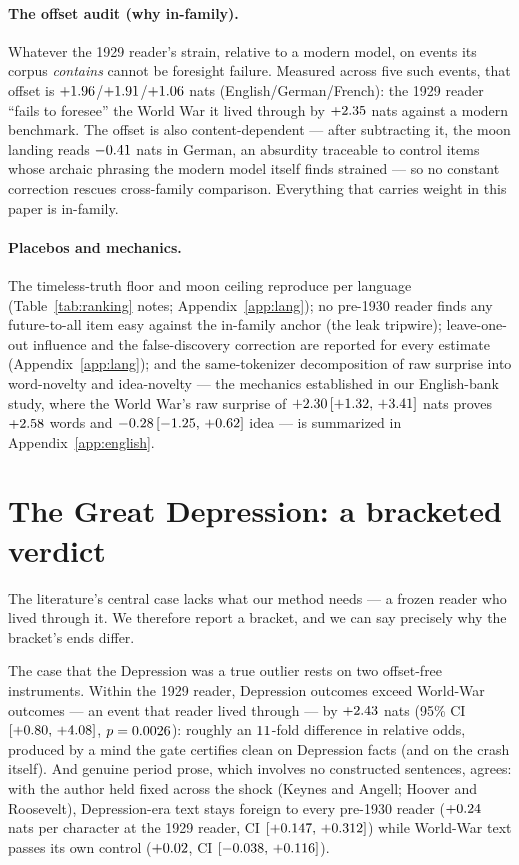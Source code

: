 \documentclass[11pt]{article}
\begin{document}
\paragraph{The offset audit (why in-family).} Whatever the 1929 reader's strain, relative to a modern model,
on events its corpus \emph{contains} cannot be foresight failure. Measured across five such events, that
offset is $+1.96$/$+1.91$/$+1.06$ nats (English/German/French): the 1929 reader
``fails to foresee'' the World War it lived through by $+2.35$ nats against a modern benchmark. The
offset is also content-dependent --- after subtracting it, the moon landing reads $-0.41$ nats in
German, an absurdity traceable to control items whose archaic phrasing the modern model itself finds strained
--- so no constant correction rescues cross-family comparison. Everything that carries weight in this paper is
in-family.

\paragraph{Placebos and mechanics.} The timeless-truth floor and moon ceiling reproduce per language
(Table~\ref{tab:ranking} notes; Appendix~\ref{app:lang}); no pre-1930 reader finds any future-to-all item
easy against the in-family anchor (the leak tripwire); leave-one-out influence and the false-discovery
correction are reported for every estimate (Appendix~\ref{app:lang}); and the same-tokenizer decomposition
of raw surprise into word-novelty and idea-novelty --- the mechanics established in our English-bank study,
where the World War's raw surprise of $+2.30\,[+1.32,\,+3.41]$ nats proves $+2.58$ words and $-0.28\,[-1.25,\,+0.62]$ idea ---
is summarized in Appendix~\ref{app:english}.

\section{The Great Depression: a bracketed verdict}\label{sec:depression}

The literature's central case lacks what our method needs --- a frozen reader who lived through it. We
therefore report a bracket, and we can say precisely why the bracket's ends differ.

The case that the Depression was a true outlier rests on two offset-free instruments. Within the 1929
reader, Depression outcomes exceed World-War outcomes --- an event that reader lived through --- by
$+2.43$ nats (95\% CI $[+0.80,\,+4.08]$, $p=0.0026$): roughly an $11$-fold difference
in relative odds, produced by a mind the gate certifies clean on Depression facts (and on the crash itself).
And genuine period prose, which involves no constructed sentences, agrees: with the author held fixed across
the shock (Keynes and Angell; Hoover and Roosevelt), Depression-era text stays foreign to every pre-1930
reader ($+0.24$ nats per character at the 1929 reader, CI $[+0.147,\,+0.312]$) while World-War text
passes its own control ($+0.02$, CI $[-0.038,\,+0.116]$).
\end{document}
